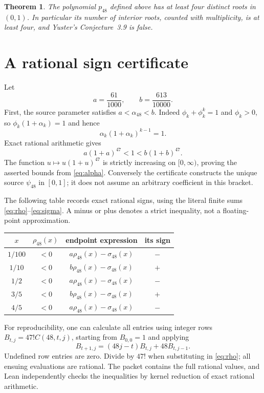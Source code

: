 \documentclass[11pt]{article}
\newtheorem{theorem}{Theorem}
\begin{document}
\begin{theorem}\label{thm:counterexample}
The polynomial $p_{48}$ defined above has at least four distinct roots
in $(0,1)$. In particular its number of interior roots, counted with
multiplicity, is at least four, and Yuster's Conjecture~3.9 is false.
\end{theorem}

\section{A rational sign certificate}
Let
\[
 a=\frac{61}{1000},\qquad b=\frac{613}{10000}.
\]
First, the source parameter satisfies $a<\alpha_{48}<b$. Indeed
$\phi_k+\phi_k^k=1$ and $\phi_k>0$, so
$\phi_k(1+\alpha_k)=1$ and hence
\begin{equation}\label{eq:alpha}
 \alpha_k(1+\alpha_k)^{k-1}=1.
\end{equation}
Exact rational arithmetic gives
\[
 a(1+a)^{47}<1<b(1+b)^{47}.
\]
The function $u\mapsto u(1+u)^{47}$ is strictly increasing on
$[0,\infty)$, proving the asserted bounds from \eqref{eq:alpha}.
Conversely the certificate constructs the unique source $\psi_{48}$
in $[0,1]$; it does not assume an arbitrary coefficient in this bracket.

The following table records exact rational signs, using the literal
finite sums \eqref{eq:rho}--\eqref{eq:sigma}. A minus or plus denotes a
strict inequality, not a floating-point approximation.
\begin{center}
\begin{tabular}{c|c|c|c}
 $x$ & $\rho_{48}(x)$ & endpoint expression & its sign\\\hline
 $1/100$ & $<0$ & $a\rho_{48}(x)-\sigma_{48}(x)$ & $-$\\
 $1/10$  & $<0$ & $b\rho_{48}(x)-\sigma_{48}(x)$ & $+$\\
 $1/2$   & $<0$ & $a\rho_{48}(x)-\sigma_{48}(x)$ & $-$\\
 $3/5$   & $<0$ & $b\rho_{48}(x)-\sigma_{48}(x)$ & $+$\\
 $4/5$   & $<0$ & $a\rho_{48}(x)-\sigma_{48}(x)$ & $-$
\end{tabular}
\end{center}
For reproducibility, one can calculate all entries using integer rows
$B_{t,j}=47!C(48,t,j)$, starting from $B_{0,0}=1$ and applying
\[
 B_{t+1,j}=(48j-t)B_{t,j}+48B_{t,j-1}.
\]
Undefined row entries are zero. Divide by $47!$ when substituting in
\eqref{eq:rho}; all ensuing evaluations are rational. The packet
contains the full rational values, and Lean independently checks the
inequalities by kernel reduction of exact rational arithmetic.
\end{document}
